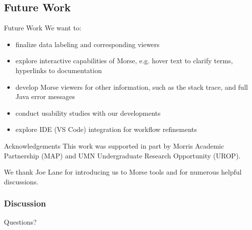 \documentclass{beamer}
\begin{document}
\subsection{Future Work}
\begin{frame}{Future Work}
  We want to:
  \begin{itemize}
    \item finalize data labeling and corresponding viewers
    \item explore interactive capabilities of Morse, e.g. hover text to clarify terms, hyperlinks to documentation
    \item develop Morse viewers for other information, such as the stack trace, and full Java error messages
    \item conduct usability studies with our developments
    \item explore IDE (VS Code) integration for workflow refinements
  \end{itemize}
  \end{frame}

\begin{frame}{Acknowledgements}
This work was supported in part by Morris Academic Partnership (MAP) and UMN Undergraduate Research Opportunity (UROP).  \\ 

\vspace*{0.2in}

We thank Joe Lane for introducing us to Morse tools and for numerous helpful discussions.
\end{frame}

\begin{frame}
  \frametitle{Discussion}
Questions?
\end{frame}
\end{document}
